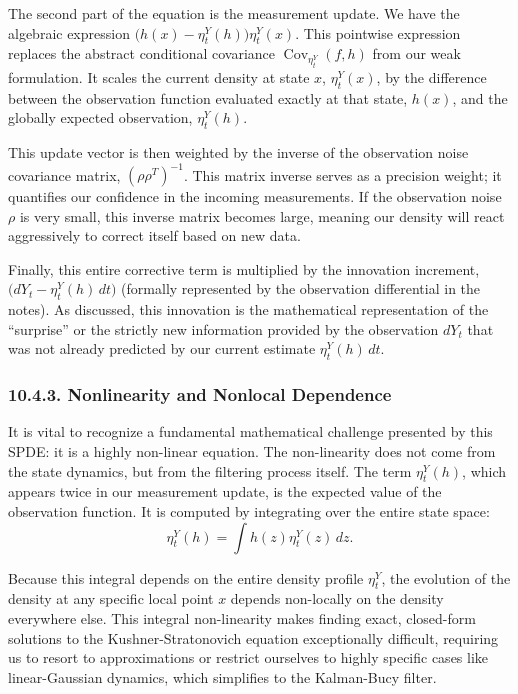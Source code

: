 \documentclass[11pt]{article}
\theoremstyle{definition}
\theoremstyle{remark}
\begin{document}
The second part of the equation is the measurement update. We have the algebraic expression $\bigl(h(x)-\eta_t^Y(h)\bigr)\eta_t^Y(x)$. This pointwise expression replaces the abstract conditional covariance $\operatorname{Cov}_{\eta_t^Y}(f,h)$ from our weak formulation. It scales the current density at state $x$, $\eta_t^Y(x)$, by the difference between the observation function evaluated exactly at that state, $h(x)$, and the globally expected observation, $\eta_t^Y(h)$.

This update vector is then weighted by the inverse of the observation noise covariance matrix, $(\rho\rho^T)^{-1}$. This matrix inverse serves as a precision weight; it quantifies our confidence in the incoming measurements. If the observation noise $\rho$ is very small, this inverse matrix becomes large, meaning our density will react aggressively to correct itself based on new data.

Finally, this entire corrective term is multiplied by the innovation increment, $\bigl(dY_t-\eta_t^Y(h)\,dt\bigr)$ (formally represented by the observation differential in the notes). As discussed, this innovation is the mathematical representation of the ``surprise'' or the strictly new information provided by the observation $dY_t$ that was not already predicted by our current estimate $\eta_t^Y(h)\,dt$.

\subsubsection*{10.4.3. Nonlinearity and Nonlocal Dependence}
It is vital to recognize a fundamental mathematical challenge presented by this SPDE: it is a highly non-linear equation. The non-linearity does not come from the state dynamics, but from the filtering process itself. The term $\eta_t^Y(h)$, which appears twice in our measurement update, is the expected value of the observation function. It is computed by integrating over the entire state space:
\[
\eta_t^Y(h)=\int h(z)\eta_t^Y(z)\,dz.
\]

Because this integral depends on the entire density profile $\eta_t^Y$, the evolution of the density at any specific local point $x$ depends non-locally on the density everywhere else. This integral non-linearity makes finding exact, closed-form solutions to the Kushner-Stratonovich equation exceptionally difficult, requiring us to resort to approximations or restrict ourselves to highly specific cases like linear-Gaussian dynamics, which simplifies to the Kalman-Bucy filter.
\end{document}
